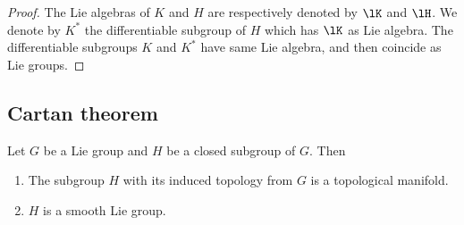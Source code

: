 \begin{proof}
	The Lie algebras of $K$ and $H$ are respectively denoted by $\lK$ and $\lH$. We denote by $K^*$ the differentiable subgroup of $H$ which has $\lK$ as Lie algebra. The differentiable subgroups $K$ and $K^*$ have same Lie algebra, and then coincide as Lie groups.
\end{proof}

\subsection{Cartan theorem}


\begin{proposition}	\label{PROPooSOOTooMrtYmP}
	Let \( G\) be a Lie group and \( H\) be a closed subgroup of \( G\). Then
	\begin{enumerate}
		\item		\label{ITEMooQUKXooISAtJV}
		      The subgroup \( H\) with its induced topology from \( G\) is a topological manifold.
		\item		\label{ITEMooYGZFooUshihY}
		      \( H\) is a smooth Lie group.
	\end{enumerate}
\end{proposition}

